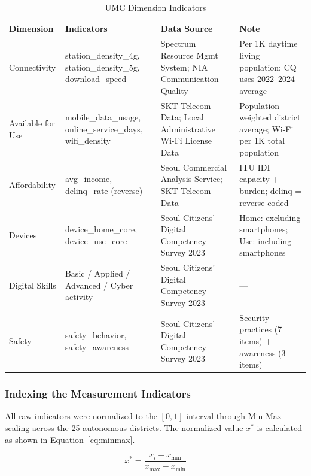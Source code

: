 \begin{table}[htbp]
  \centering\small
  \caption{UMC Dimension Indicators}
  \label{tab:1-umc-dims}
  \begin{tabularx}{\textwidth}{l Y Y Y}
    \toprule
    \textbf{Dimension} & \textbf{Indicators} & \textbf{Data Source} & \textbf{Note} \\
    \midrule
    Connectivity & station\_density\_4g, station\_density\_5g, download\_speed & Spectrum Resource Mgmt System; NIA Communication Quality & Per 1K daytime living population; CQ uses 2022--2024 average \\
    \addlinespace[2pt]
    Available for Use & mobile\_data\_usage, online\_service\_days, wifi\_density & SKT Telecom Data; Local Administrative Wi-Fi License Data & Population-weighted district average; Wi-Fi per 1K total population \\
    \addlinespace[2pt]
    Affordability & avg\_income, delinq\_rate (reverse) & Seoul Commercial Analysis Service; SKT Telecom Data & ITU IDI capacity + burden; delinq = reverse-coded \\
    \addlinespace[2pt]
    Devices & device\_home\_core, device\_use\_core & Seoul Citizens' Digital Competency Survey 2023 & Home: excluding smartphones; Use: including smartphones \\
    \addlinespace[2pt]
    Digital Skills & Basic / Applied / Advanced / Cyber activity & Seoul Citizens' Digital Competency Survey 2023 & --- \\
    \addlinespace[2pt]
    Safety & safety\_behavior, safety\_awareness & Seoul Citizens' Digital Competency Survey 2023 & Security practices (7 items) + awareness (3 items) \\
    \bottomrule
  \end{tabularx}
\end{table}

\subsubsection{Indexing the Measurement Indicators}
\label{subsubsec:3-1-2}

All raw indicators were normalized to the $[0,1]$ interval through Min-Max scaling across the 25 autonomous districts. The normalized value $x^{*}$ is calculated as shown in Equation~\eqref{eq:minmax}.

\begin{equation}\label{eq:minmax}
  x^{*} = \frac{x_{i} - x_{\min}}{x_{\max} - x_{\min}}
\end{equation}

